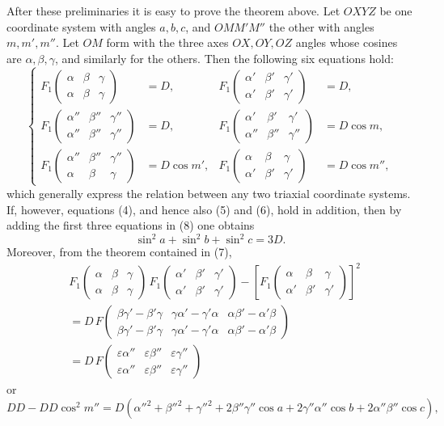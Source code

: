 \documentclass[11pt]{article}
\newcommand{\ffone}[6]{F_1\!\left(\begin{array}{ccc}#1&#2&#3\\#4&#5&#6\end{array}\right)}
\begin{document}
After these preliminaries it is easy to prove the theorem above. Let $OXYZ$ be one coordinate system with angles $a,b,c$, and $OMM'M''$ the other with angles $m,m',m''$. Let $OM$ form with the three axes $OX,OY,OZ$ angles whose cosines are $\alpha,\beta,\gamma$, and similarly for the others. Then the following six equations hold:
\begin{equation}
\left\{
\begin{aligned}
\ffone{\alpha}{\beta}{\gamma}{\alpha}{\beta}{\gamma}&=D, &
\ffone{\alpha'}{\beta'}{\gamma'}{\alpha'}{\beta'}{\gamma'}&=D,\\
\ffone{\alpha''}{\beta''}{\gamma''}{\alpha''}{\beta''}{\gamma''}&=D, &
\ffone{\alpha'}{\beta'}{\gamma'}{\alpha''}{\beta''}{\gamma''}&=D\cos m,\\
\ffone{\alpha''}{\beta''}{\gamma''}{\alpha}{\beta}{\gamma}&=D\cos m', &
\ffone{\alpha}{\beta}{\gamma}{\alpha'}{\beta'}{\gamma'}&=D\cos m'',
\end{aligned}\right.
\tag{8}
\end{equation}
which generally express the relation between any two triaxial coordinate systems. If, however, equations (4), and hence also (5) and (6), hold in addition, then by adding the first three equations in (8) one obtains
\begin{equation}
\sin^2a+\sin^2b+\sin^2c=3D.
\tag{9}
\end{equation}
Moreover, from the theorem contained in (7),
\[
\begin{aligned}
&\ffone{\alpha}{\beta}{\gamma}{\alpha}{\beta}{\gamma}\,
 \ffone{\alpha'}{\beta'}{\gamma'}{\alpha'}{\beta'}{\gamma'}
 -\left[\ffone{\alpha}{\beta}{\gamma}{\alpha'}{\beta'}{\gamma'}\right]^2\\
&=D\,F\!\left(\begin{array}{ccc}
\beta\gamma'-\beta'\gamma&\gamma\alpha'-\gamma'\alpha&\alpha\beta'-\alpha'\beta\\
\beta\gamma'-\beta'\gamma&\gamma\alpha'-\gamma'\alpha&\alpha\beta'-\alpha'\beta
\end{array}\right)\\
&=D\,F\!\left(\begin{array}{ccc}
\varepsilon\alpha''&\varepsilon\beta''&\varepsilon\gamma''\\
\varepsilon\alpha''&\varepsilon\beta''&\varepsilon\gamma''
\end{array}\right)
\end{aligned}
\]
or
\[
DD-DD\cos^2m''
=D(\alpha''^2+\beta''^2+\gamma''^2+2\beta''\gamma''\cos a+2\gamma''\alpha''\cos b+2\alpha''\beta''\cos c),
\]
\end{document}

